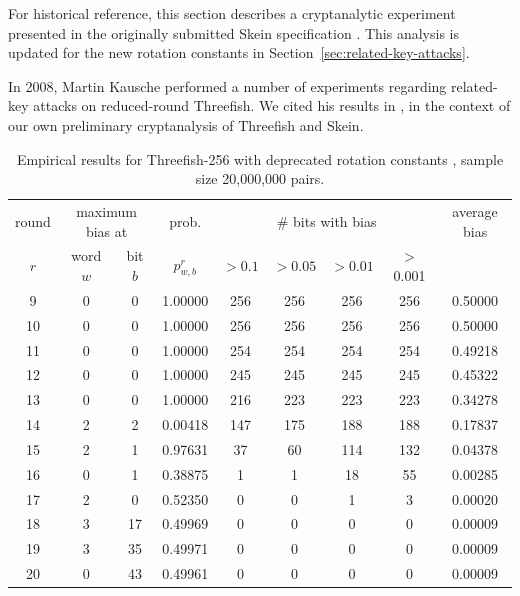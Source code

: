 \documentclass[11pt,twoside]{article}
\begin{document}
For historical reference, this section describes a cryptanalytic experiment presented in the originally submitted Skein specification \cite{Skein1}.  This analysis is updated for the new rotation constants in Section~\ref{sec:related-key-attacks}.

In 2008, Martin Kausche \cite{MartinKausche2008} performed a number of experiments regarding related-key attacks on reduced-round Threefish. We cited his results in \cite{Skein1}, in the context of our own preliminary cryptanalysis of Threefish and Skein. 

\begin{table}[tbh]
  \centering
\begin{tabular}{|c|ccc|cccc|c|}
\hline
round & \multicolumn{ 2}{c}{maximum bias at}& prob. & \multicolumn{ 4}{c|}{\# bits with bias} &
average bias \\
$r$ & word $w$ & bit $b$ & $p^r_{w,b}$ & $>0.1$ & $>0.05$ & $>0.01$ & $>$ 0.001 & \\  \hline
 9 &  0 &  0 &    1.00000 &  256 &  256 &  256 &  256 &    0.50000 \\ \hline
 10 &  0 &  0 &    1.00000 &  256 &  256 &  256 &  256 &    0.50000 \\ \hline
 11 &  0 &  0 &    1.00000 &  254 &  254 &  254 &  254 &    0.49218 \\ \hline
 12 &  0 &  0 &    1.00000 &  245 &  245 &  245 &  245 &    0.45322 \\ \hline
 13 &  0 &  0 &    1.00000 &  216 &  223 &  223 &  223 &    0.34278 \\ \hline
 14 &  2 &  2 &    0.00418 &  147 &  175 &  188 &  188 &    0.17837 \\ \hline
 15 &  2 &  1 &    0.97631 &  37 &  60 &  114 &  132 &    0.04378 \\ \hline
 16 &  0 &  1 &    0.38875 &  1 &  1 &  18 &  55 &    0.00285 \\ \hline
 17 &  2 &  0 &    0.52350 &  0 &  0 &  1 &  3 &    0.00020 \\ \hline
 18 &  3 &  17 &    0.49969 &  0 &  0 &  0 &  0 &    0.00009 \\ \hline
 19 &  3 &  35 &    0.49971 &  0 &  0 &  0 &  0 &    0.00009 \\ \hline
 20 &  0 &  43 &    0.49961 &  0 &  0 &  0 &  0 &    0.00009 \\ \hline
\end{tabular}
  \caption{Empirical results for Threefish-256 with deprecated rotation constants \cite{MartinKausche2008}, sample size 20,000,000 pairs.}
  \label{tab:KauscheObservationsFor256}
\end{table}
\end{document}
